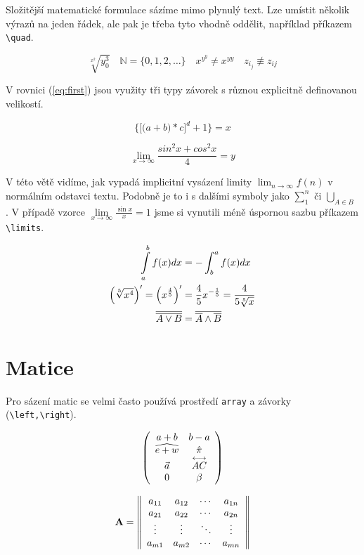 \documentclass[11pt,a4paper, twocolumn]{article}
\theoremstyle{definition}
\theoremstyle{plain}
\begin{document}
Složitější matematické formulace sázíme mimo plynulý text. Lze umístit několik výrazů na jeden řádek, ale pak je třeba tyto vhodně oddělit, například příkazem \verb|\quad|.

\[ \sqrt[x^2]{y_0^3} \quad \mathbb{N} = \{ 0,1,2, \ldots \} \quad x^{y^y} \neq x^{yy} \quad z_{i_j} \not \equiv z_{ij} \]

V rovnici (\ref{eq:first}) jsou využity tři typy závorek s různou explicitně definovanou velikostí.

\begin{equation}\label{eq:first}
\bigg\{ \Big[ \big( a+b \big) * c \Big] ^d + 1 \bigg\} = x
\end{equation}

\[ \lim_{x\to\infty} \frac{sin^2x+cos^2x}{4}=y \]

V této větě vidíme, jak vypadá implicitní vysázení limity $\lim_{n\to\infty} f(n)$ v normálním odstavci textu. Podobně je to i s dalšími symboly jako $\sum_1^n$ či $\bigcup_{A\in B}$ . V případě vzorce $\lim\limits_{x\to\infty}\frac{\sin x}{x} = 1$ jsme si vynutili méně úspornou sazbu příkazem \verb|\limits|.

\begin{align}
\int\displaylimits_a^b f(x)dx &= - \int_b^a f(x)dx \\
\Big( \sqrt[5]{x^4} \Big)^\prime = \Big( x^{\frac{4}{5}} \Big)^\prime &= \frac{4}{5}x^{-\frac{1}{5}} = \frac{4}{5 \sqrt[5]{x}} \\
\overline{\overline{A \vee B}} &= \overline{\overline{A} \wedge \overline{B}}
\end{align}

\section{Matice}

Pro sázení matic se velmi často používá prostředí \verb|array| a závorky (\verb|\left,\right|). 

\[\left(
\begin{array}{c c c}
  a+b & b-a \\
  \widehat{e+w} & \hat{\pi} \\
  \vec{a}  & \stackrel{\longleftrightarrow}{AC}  \\
  0 & \beta
\end{array}
\right)\] 	

\[ \mathbf{A} =
\left\|
\begin{array}{c c c c c}
  a_{11} & a_{12} & \cdots & a_{1n} \\
  a_{21} & a_{22} & \cdots & a_{2n} \\
  \vdots  & \vdots  & \ddots & \vdots  \\
  a_{m1} & a_{m2} & \cdots & a_{mn}
\end{array}
\right\| \]
\end{document}
